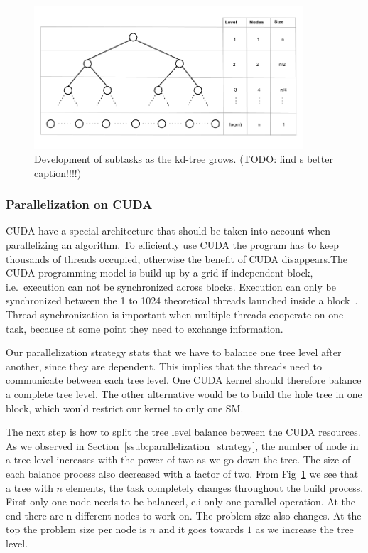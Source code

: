 \begin{figure}[ht!]
\centering
\includegraphics[width=100mm]{../gfx/Tree_level_development.png}

\caption{Development of subtasks as the kd-tree grows. (TODO: find s better caption!!!!) }
\label{fig:tree_level_development}
\end{figure}


\subsubsection{Parallelization on CUDA} %
\label{ssub:divide_work_on_cuda}


CUDA have a special architecture that should be taken into account when parallelizing an algorithm. To efficiently use CUDA the program has to keep thousands of threads occupied, otherwise the benefit of CUDA disappears.The CUDA programming model is build up by a grid if independent block, i.e.\ execution can not be synchronized across blocks. Execution can only be synchronized between the 1 to 1024 theoretical threads launched inside a block~\cite{cuda_programming_guide}. Thread synchronization is important when multiple threads cooperate on one task, because at some point they need to exchange information.


Our parallelization strategy stats that we have to balance one tree level after another, since they are dependent. This implies that the threads need to communicate between each tree level. One CUDA kernel should therefore balance a complete tree level. The other alternative would be to build the hole tree in one block, which would restrict our kernel to only one SM\@.

The next step is how to split the tree level balance between the CUDA resources. As we observed in Section~\ref{ssub:parallelization_strategy}, the number of node in a tree level increases with the power of two as we go down the tree. The size of each balance process also decreased with a factor of two. From Fig~\ref{fig:tree_level_development} we see that a tree with $n$ elements, the task completely changes throughout the build process. First  only one node needs to be balanced, e.i only one parallel operation. At the end there are n different nodes to work on. The problem size also changes. At the top the problem size per node is $n$ and it goes towards $1$ as we increase the tree level.

